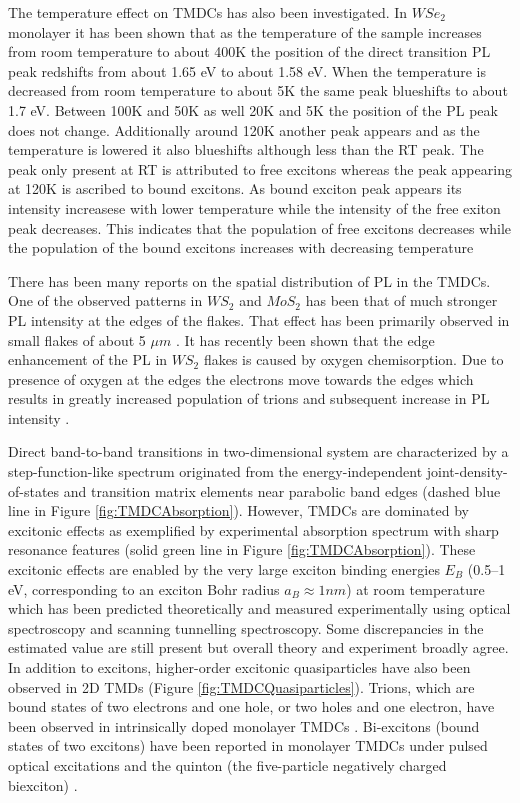 The temperature effect on TMDCs has also been investigated. In $WSe_2$ monolayer it has been shown that as the temperature of the sample increases from room temperature to about 400K the position of the direct transition PL peak redshifts from about 1.65 eV to about 1.58 eV. When the temperature is decreased from room temperature to about 5K the same peak blueshifts to about 1.7 eV. Between 100K and 50K as well 20K and 5K the position of the PL peak does not change. Additionally around 120K another peak appears and as the temperature is lowered it also blueshifts although less than the RT peak. The peak only present at RT is attributed to free excitons whereas the peak appearing at 120K is ascribed to bound excitons. As bound exciton peak appears its intensity increasese with lower temperature while the intensity of the free exiton peak decreases. This indicates that the population of free excitons decreases while the population of the bound excitons increases with decreasing temperature \cite{PhotoluminescencePropertiesAndExcitonDynamicsInMonolayerWSe2}
	
There has been many reports on the spatial distribution of PL in the TMDCs. One of the observed patterns in $WS_2$ and $MoS_2$ has been that of much stronger PL intensity at the edges of the flakes. That effect has been primarily observed in small flakes of about 5 $\mu m$ \cite{ExtraordinaryRoomTemperaturePhotoluminescenceInTriangularWS2Monolayers}. It has recently been shown that the edge enhancement of the PL in $WS_2$ flakes is caused by oxygen chemisorption. Due to presence of oxygen at the edges the electrons move towards the edges which results in greatly increased population of trions and subsequent increase in PL intensity \cite{Hu2019}.

Direct band-to-band transitions in two-dimensional system are characterized by a step-function-like spectrum originated from the energy-independent joint-density-of-states and transition matrix elements near parabolic band edges \cite{Haug1994} (dashed blue line in Figure \ref{fig:TMDCAbsorption}). However, TMDCs  are dominated by excitonic effects as exemplified by experimental absorption spectrum with sharp resonance features \cite{EmergingPhotoluminescenceInMonolayerMoS2} (solid green line in Figure \ref{fig:TMDCAbsorption}). These excitonic effects are enabled by the very large exciton binding energies $E_B$ (0.5–1 eV, corresponding to an exciton Bohr radius $a_B \approx 1 nm$) at room temperature which has been predicted theoretically and measured experimentally using optical spectroscopy and scanning tunnelling spectroscopy. Some discrepancies in the estimated value are still present but overall theory and experiment broadly agree. 
In addition to excitons, higher-order excitonic quasiparticles have also been observed in 2D TMDs (Figure \ref{fig:TMDCQuasiparticles}). Trions, which are bound states of two electrons and one hole, or two holes and one electron, have been observed in intrinsically doped monolayer TMDCs \cite{Mak2012}\cite{Ross2013}. Bi-excitons (bound states of two excitons) have been reported in monolayer TMDCs under pulsed optical excitations \cite{doi:10.1021/nn5059908}\cite{You2015} and the quinton (the five-particle negatively charged biexciton) \cite{Barbone2018}.
 
